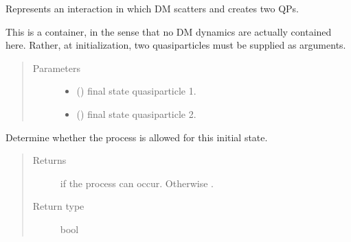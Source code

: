 \documentclass[letterpaper,10pt,english]{sphinxmanual}
\begin{document}
\begin{fulllineitems}
\label{\detokenize{code_structure:scdc.interaction.DarkMatterScatter}}
Represents an interaction in which DM scatters and creates two QPs.

This is a container, in the sense that no DM dynamics are actually
contained here. Rather, at initialization, two quasiparticles must be
supplied as arguments.
\begin{quote}\begin{description}
\item[{Parameters}] \leavevmode\begin{itemize}
\item {} 
 () \textendash{} final state quasiparticle 1.

\item {} 
 () \textendash{} final state quasiparticle 2.

\end{itemize}

\end{description}\end{quote}

\begin{fulllineitems}
\label{\detokenize{code_structure:scdc.interaction.DarkMatterScatter.allowed}}
Determine whether the process is allowed for this initial state.
\begin{quote}\begin{description}
\item[{Returns}] \leavevmode
{} if the process can occur. Otherwise .

\item[{Return type}] \leavevmode
bool

\end{description}\end{quote}

\end{fulllineitems}


\end{fulllineitems}
\end{document}
